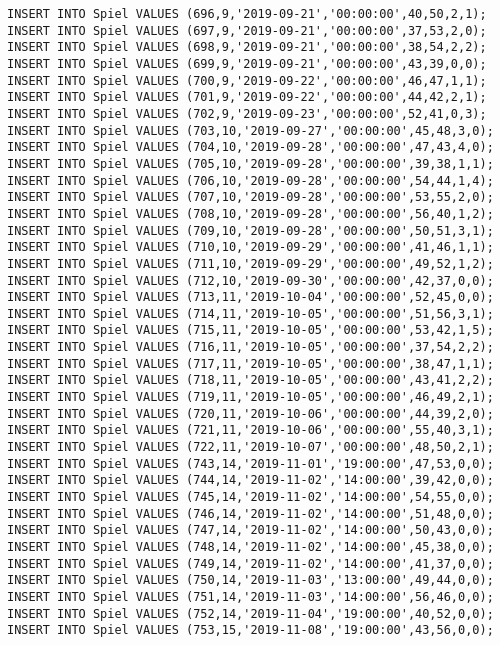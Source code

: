 \documentclass{bschlangaul-aufgabe}
\begin{document}
\begin{verbatim}
INSERT INTO Spiel VALUES (696,9,'2019-09-21','00:00:00',40,50,2,1);
INSERT INTO Spiel VALUES (697,9,'2019-09-21','00:00:00',37,53,2,0);
INSERT INTO Spiel VALUES (698,9,'2019-09-21','00:00:00',38,54,2,2);
INSERT INTO Spiel VALUES (699,9,'2019-09-21','00:00:00',43,39,0,0);
INSERT INTO Spiel VALUES (700,9,'2019-09-22','00:00:00',46,47,1,1);
INSERT INTO Spiel VALUES (701,9,'2019-09-22','00:00:00',44,42,2,1);
INSERT INTO Spiel VALUES (702,9,'2019-09-23','00:00:00',52,41,0,3);
INSERT INTO Spiel VALUES (703,10,'2019-09-27','00:00:00',45,48,3,0);
INSERT INTO Spiel VALUES (704,10,'2019-09-28','00:00:00',47,43,4,0);
INSERT INTO Spiel VALUES (705,10,'2019-09-28','00:00:00',39,38,1,1);
INSERT INTO Spiel VALUES (706,10,'2019-09-28','00:00:00',54,44,1,4);
INSERT INTO Spiel VALUES (707,10,'2019-09-28','00:00:00',53,55,2,0);
INSERT INTO Spiel VALUES (708,10,'2019-09-28','00:00:00',56,40,1,2);
INSERT INTO Spiel VALUES (709,10,'2019-09-28','00:00:00',50,51,3,1);
INSERT INTO Spiel VALUES (710,10,'2019-09-29','00:00:00',41,46,1,1);
INSERT INTO Spiel VALUES (711,10,'2019-09-29','00:00:00',49,52,1,2);
INSERT INTO Spiel VALUES (712,10,'2019-09-30','00:00:00',42,37,0,0);
INSERT INTO Spiel VALUES (713,11,'2019-10-04','00:00:00',52,45,0,0);
INSERT INTO Spiel VALUES (714,11,'2019-10-05','00:00:00',51,56,3,1);
INSERT INTO Spiel VALUES (715,11,'2019-10-05','00:00:00',53,42,1,5);
INSERT INTO Spiel VALUES (716,11,'2019-10-05','00:00:00',37,54,2,2);
INSERT INTO Spiel VALUES (717,11,'2019-10-05','00:00:00',38,47,1,1);
INSERT INTO Spiel VALUES (718,11,'2019-10-05','00:00:00',43,41,2,2);
INSERT INTO Spiel VALUES (719,11,'2019-10-05','00:00:00',46,49,2,1);
INSERT INTO Spiel VALUES (720,11,'2019-10-06','00:00:00',44,39,2,0);
INSERT INTO Spiel VALUES (721,11,'2019-10-06','00:00:00',55,40,3,1);
INSERT INTO Spiel VALUES (722,11,'2019-10-07','00:00:00',48,50,2,1);
INSERT INTO Spiel VALUES (743,14,'2019-11-01','19:00:00',47,53,0,0);
INSERT INTO Spiel VALUES (744,14,'2019-11-02','14:00:00',39,42,0,0);
INSERT INTO Spiel VALUES (745,14,'2019-11-02','14:00:00',54,55,0,0);
INSERT INTO Spiel VALUES (746,14,'2019-11-02','14:00:00',51,48,0,0);
INSERT INTO Spiel VALUES (747,14,'2019-11-02','14:00:00',50,43,0,0);
INSERT INTO Spiel VALUES (748,14,'2019-11-02','14:00:00',45,38,0,0);
INSERT INTO Spiel VALUES (749,14,'2019-11-02','14:00:00',41,37,0,0);
INSERT INTO Spiel VALUES (750,14,'2019-11-03','13:00:00',49,44,0,0);
INSERT INTO Spiel VALUES (751,14,'2019-11-03','14:00:00',56,46,0,0);
INSERT INTO Spiel VALUES (752,14,'2019-11-04','19:00:00',40,52,0,0);
INSERT INTO Spiel VALUES (753,15,'2019-11-08','19:00:00',43,56,0,0);

\end{verbatim}
\end{document}
